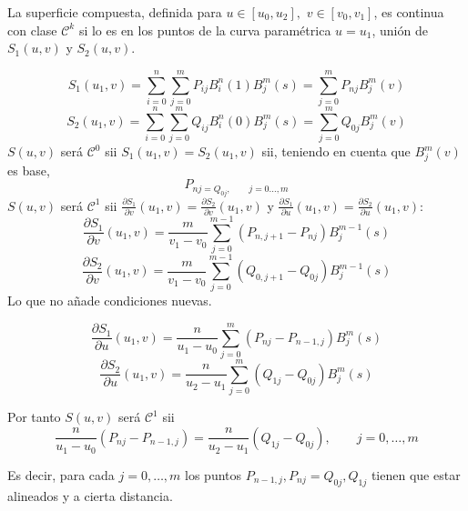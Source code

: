 \documentclass[ebook,oneside]{memoir}
\begin{document}
La superficie compuesta, definida para $u\in [u_0,u_2],$ \quad $v\in [v_0,v_1]$, es continua con clase ${\mathcal  C}^k$ si lo es en los puntos de la curva param\'{e}trica $u=u_1$, uni\'{o}n de $S_1(u,v)$ y $S_2(u,v)$.

$$S_1(u_1,v)= \sum_{i=0}^n \sum_{j=0}^m P_{ij} B_i^n(1) B_j^m(s)=\sum_{j=0}^m P_{nj} B_j^m(v)$$
$$S_2(u_1,v)= \sum_{i=0}^n \sum_{j=0}^m Q_{ij} B_i^n(0) B_j^m(s)= \sum_{j=0}^m Q_{0j} B_j^m (v)$$
$S(u,v)$ ser\'{a} ${\mathcal  C}^0$ sii $S_1(u_1,v)=S_2(u_1,v)$ sii, teniendo en cuenta que $B_j^m(v)$ es base,
$$P_{nj=Q_{0j},\quad \quad j=0\ldots,m}$$
$S(u,v)$ ser\'{a} ${\mathcal  C}^1$ sii $\frac{\partial S_1}{\partial v} (u_1,v)=\frac{\partial S_2}{\partial v}(u_1,v)$  y $\frac{\partial S_1}{\partial u} (u_1,v)=\frac{\partial S_2}{\partial u}(u_1,v)$:
$$\frac{\partial S_1}{\partial v}(u_1,v)= \frac{m}{v_1-v_0} \sum_{j=0}^{m-1} (P_{n,j+1}-P_{nj}) B_j^{m-1}(s)$$
$$\frac{\partial S_2}{\partial v}(u_1,v)= \frac{m}{v_1-v_0} \sum_{j=0}^{m-1} (Q_{0,j+1}-Q_{0j}) B_j^{m-1}(s)$$
Lo que no a\~{n}ade condiciones nuevas.

$$\frac{\partial S_1}{\partial u}(u_1,v)= \frac{n}{u_1-u_0} \sum_{j=0}^{m} (P_{nj}-P_{n-1,j}) B_j^{m}(s)$$
$$\frac{\partial S_2}{\partial u}(u_1,v)= \frac{n}{u_2-u_1} \sum_{j=0}^{m} (Q_{1j}-Q_{0j}) B_j^{m}(s)$$

Por tanto $S(u,v)$ ser\'{a} ${\mathcal  C}^1$ sii
$$\frac{n}{u_1-u_0}(P_{nj}-P_{n-1,j})= \frac{n}{u_2-u_1}(Q_{1j}-Q_{0j}), \quad \quad j=0,\ldots,m$$

Es decir, para cada $j=0,\ldots,m$ los puntos $P_{n-1,j}, P_{nj}=Q_{0j}, Q_{1j}$ tienen que estar alineados y a cierta distancia.
\end{document}

